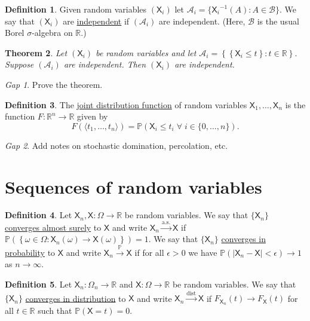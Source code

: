 \documentclass[11pt]{article}
\newcommand{\col}[1]{\mathscr{#1}}
\newcommand{\rv}[1]{\mathsf{#1}}
\newcommand{\p}{\mathbb{P}}
\newcommand{\bor}{\col{B}}
\newcommand{\defname}[1]{\underline{#1}}
\newcommand{\asto}{\xrightarrow{\text{a.s.}}}
\newcommand{\pto}{\xrightarrow{\p}}
\newcommand{\disto}{\xrightarrow{\text{dist}}}
\newcommand{\RR}{\mathbb{R}}
\theoremstyle{theorem}
\newtheorem{theorem}{Theorem}[section]
\theoremstyle{definition}
\newtheorem{definition}[theorem]{Definition}
\theoremstyle{remark}
\theoremstyle{step}
\theoremstyle{gap}
\newtheorem*{gap}{Gap}
\begin{document}
\begin{definition}
Given random variables \((\rv{X}_i)\) let \(\col{A}_i = \{{\rv{X}_i}^{-1}(A) : A \in \bor\}\). We say that \((\rv{X}_i)\) are \defname{independent} if \((\col{A}_i)\) are independent. (Here, \(\bor\) is the usual Borel \(\sigma\)-algebra on \(\RR\).)
\end{definition}

\begin{theorem}
Let \((\rv{X}_i)\) be random variables and let \(\col{A}_i = \left\{\left\{\rv{X}_i \leq t\right\} : t \in \RR\right\}\). Suppose \((\col{A}_i)\) are independent. Then \((\rv{X}_i)\) are independent.
\end{theorem}

\begin{gap}
Prove the theorem.
\end{gap}

\begin{definition}
The \defname{joint distribution function} of random variables \(\rv{X}_1, \ldots, \rv{X}_n\) is the function \(F:\RR^n \to \RR\) given by \[F\left(\langle t_1, \ldots, t_n\rangle\right) = \p \left(\rv{X}_i \leq t_i \;\forall\; i \in \{0, \ldots, n\}\right).\]
\end{definition}


\begin{gap}
Add notes on stochastic domination, percolation, etc.
\end{gap}

\section{Sequences of random variables}

\begin{definition}
Let \(\rv{X}_n, \rv{X} : \Omega\to \RR\) be random variables. We say that \(\{\rv{X}_n\}\) \defname{converges almost surely} to \(\rv{X}\) and write \(\rv{X}_n \asto \rv{X}\) if \(\p\left(\left\{\omega \in \Omega : \rv{X}_n(\omega) \to \rv{X}(\omega)\right\}\right) = 1\). We say that \(\{\rv{X}_n\}\) \defname{converges in probability} to \(\rv{X}\) and write \(\rv{X}_n \pto \rv{X}\) if for all \(\epsilon>0\) we have \(\p\left(\left|\rv{X}_n-\rv{X}\right| < \epsilon\right) \to 1\) as \(n \to \infty\).
\end{definition}

\begin{definition}
Let \(\rv{X}_n : \Omega_n \to \RR\) and \(\rv{X}:\Omega \to \RR\) be random variables. We say that \(\{\rv{X}_n\}\) \defname{converges in distribution} to \(\rv{X}\) and write \(\rv{X}_n \disto \rv{X}\) if \(F_{\rv{X}_n}(t) \to F_\rv{X}(t)\) for all \(t\in\RR\) such that \(\p\left(\rv{X}=t\right) = 0\). 
\end{definition}
\end{document}
